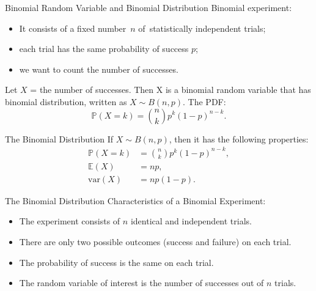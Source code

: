 \documentclass{beamer}
\newcommand{\pr}{\mathbb{P}}
\newcommand{\var}{\text{var}}
\newcommand{\E}{\mathbb{E}}
\begin{document}
\begin{frame}{Binomial Random Variable and Binomial Distribution}
Binomial experiment:
\begin{itemize}
\item It consists of a fixed number \alert{$n$} of statistically independent trials;
\item each trial has the same probability of success \alert{$p$};
\item we want to count the number of successes.  
\end{itemize}

Let $X$ = the number of successes. Then X is a \alert{binomial random variable} that has \alert{binomial distribution}, 
written as $X \sim B(n,p)$. The PDF:
$$
\pr(X=k) = \binom{n}{k} p^k (1-p)^{n-k}.
$$
\end{frame}

\begin{frame}{The Binomial Distribution}
If $X\sim B(n,p)$, then it has the following properties:
\begin{align*}
\pr(X=k) &= \binom{n}{k} p^k (1-p)^{n-k}, \tag{PDF}\\
\E(X) & = np, \tag{mean} \\
\var(X) &= np(1-p).\tag{variance}
\end{align*}
\end{frame}

\begin{frame}{The Binomial Distribution}
Characteristics of a Binomial Experiment:
\begin{itemize}
\item The experiment consists of $n$ identical and independent trials.
\item There are only two possible outcomes (success and failure) on each trial.
\item The probability of success is the same on each trial.
\item The random variable of interest is the number of successes out of $n$ trials.
\end{itemize}
\end{frame}
\end{document}
